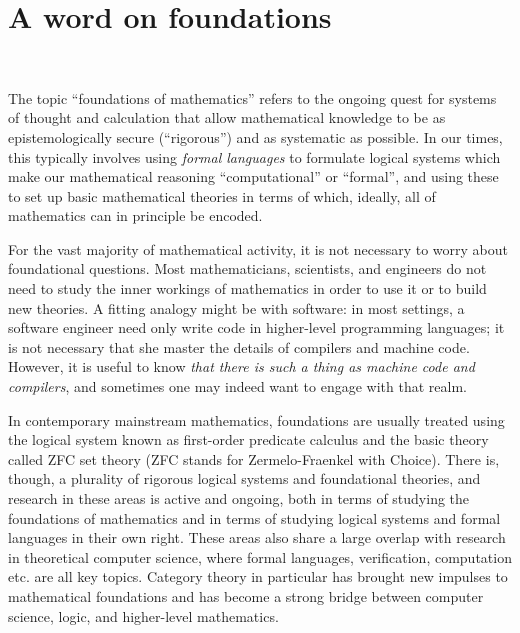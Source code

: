 

\section{A word on foundations}



\

The topic ``foundations of mathematics'' refers to the ongoing quest for systems of thought and calculation that allow mathematical knowledge to be as epistemologically secure (``rigorous'') and as systematic as possible. In our times, this typically involves using \emph{formal languages} to formulate logical systems which make our mathematical reasoning ``computational'' or ``formal'', and using these to set up basic mathematical theories in terms of which, ideally, all of mathematics can in principle be encoded. 

For the vast majority of mathematical activity, it is not necessary to worry about foundational questions. Most mathematicians, scientists, and engineers do not need to study the inner workings of mathematics in order to use it or to build new theories. A fitting analogy might be with software: in most settings, a software engineer need only write code in higher-level programming languages; it is not necessary that she master the details of compilers and machine code. However, it is useful to know \emph{that there is such a thing as machine code and compilers}, and sometimes one may indeed want to engage with that realm. 

In contemporary mainstream mathematics, foundations are usually treated using the logical system known as first-order predicate calculus and the basic theory called ZFC set theory (ZFC stands for Zermelo-Fraenkel with Choice). There is, though, a plurality of rigorous logical systems and foundational theories, and research in these areas is active and ongoing, both in terms of studying the foundations of mathematics and in terms of studying logical systems and formal languages in their own right. These areas also share a large overlap with research in theoretical computer science, where formal languages, verification, computation etc. are all key topics. Category theory in particular has brought new impulses to mathematical foundations and has become a strong bridge between computer science, logic, and higher-level mathematics. 

